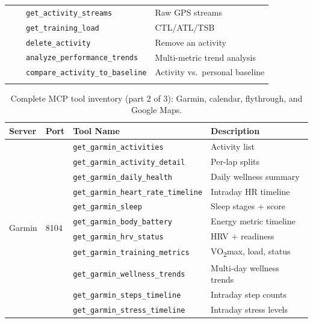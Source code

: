 \begin{table}[ht]
\begin{center}
\begin{minipage}{\textwidth}
\begin{tabularx}{\textwidth}{lllX}
  & & \texttt{get\_activity\_streams} & Raw GPS streams \\
  & & \texttt{get\_training\_load} & CTL/ATL/TSB \\
  & & \texttt{delete\_activity} & Remove an activity \\
  & & \texttt{analyze\_performance\_trends} & Multi-metric trend analysis \\
  & & \texttt{compare\_activity\_to\_baseline} & Activity vs.\ personal baseline \\
\botrule
\end{tabularx}
\end{minipage}
\end{center}
\end{table}

\begin{table}[ht]
\begin{center}
\begin{minipage}{\textwidth}
\caption[Complete MCP tool inventory (2/3)]{Complete MCP tool inventory (part 2 of 3): Garmin, calendar, flythrough, and Google Maps.}\label{tab:full_tools_b}
\begin{tabularx}{\textwidth}{lllX}
\toprule
\textbf{Server} & \textbf{Port} & \textbf{Tool Name} & \textbf{Description} \\
\midrule
\multirow{13}{*}{Garmin} & \multirow{13}{*}{8104}
  & \texttt{get\_garmin\_activities} & Activity list \\
  & & \texttt{get\_garmin\_activity\_detail} & Per-lap splits \\
  & & \texttt{get\_garmin\_daily\_health} & Daily wellness summary \\
  & & \texttt{get\_garmin\_heart\_rate\_timeline} & Intraday HR timeline \\
  & & \texttt{get\_garmin\_sleep} & Sleep stages + score \\
  & & \texttt{get\_garmin\_body\_battery} & Energy metric timeline \\
  & & \texttt{get\_garmin\_hrv\_status} & HRV + readiness \\
  & & \texttt{get\_garmin\_training\_metrics} & VO\textsubscript{2}max, load, status \\
  & & \texttt{get\_garmin\_wellness\_trends} & Multi-day wellness trends \\
  & & \texttt{get\_garmin\_steps\_timeline} & Intraday step counts \\
  & & \texttt{get\_garmin\_stress\_timeline} & Intraday stress levels \\

\end{tabularx}
\end{minipage}
\end{center}
\end{table}
